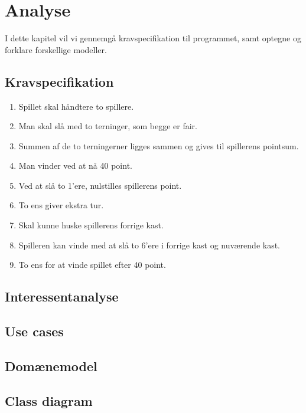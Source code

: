 \chapter{Analyse}

I dette kapitel vil vi gennemgå kravspecifikation til programmet, samt optegne og forklare forskellige modeller.


\section{Kravspecifikation}

\begin{enumerate}
    \item Spillet skal håndtere to spillere.
    \item Man skal slå med to terninger, som begge er fair.
    \item Summen af de to terningerner ligges sammen og gives til spillerens pointsum.
    \item Man vinder ved at nå 40 point.
    \item Ved at slå to 1'ere, nulstilles spillerens point.
    \item To ens giver ekstra tur.
    \item Skal kunne huske spillerens forrige kast.
    \item Spilleren kan vinde med at slå to 6'ere i forrige kast og nuværende kast.
    \item To ens for at vinde spillet efter 40 point.
\end{enumerate}

\section{Interessentanalyse}

\section{Use cases}

\section{Domænemodel}

\section{Class diagram}